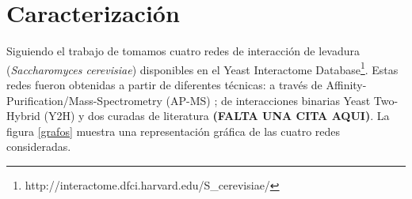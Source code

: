 
\section{Caracterizaci\'on}

Siguiendo el trabajo de \citet{zotenko2008} tomamos cuatro redes de interacci\'on de levadura (\textit{Saccharomyces cerevisiae}) disponibles en el Yeast Interactome Database\footnote{http://interactome.dfci.harvard.edu/S\_cerevisiae/}. Estas redes fueron obtenidas a partir de diferentes t\'ecnicas: a trav\'es de Affinity-Purification/Mass-Spectrometry (AP-MS) \citep{apms_data}; de 
interacciones binarias Yeast Two-Hybrid (Y2H) \citep{y2h_data} y dos curadas de literatura \citep{lit_data} {\bf (FALTA UNA CITA AQUI)}. La figura \ref{grafos} muestra una representaci\'on gr\'afica de las cuatro redes consideradas.




